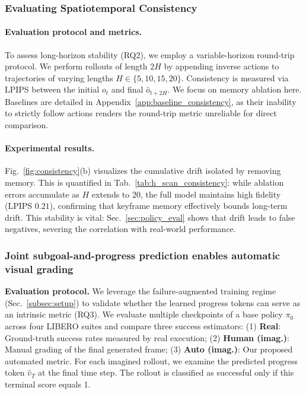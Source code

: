 \subsubsection{Evaluating Spatiotemporal Consistency}
\label{sec:exp_consistency}

\paragraph{Evaluation protocol and metrics.}
To assess long-horizon stability (RQ2), we employ a variable-horizon round-trip protocol. We perform rollouts of length $2H$ by appending inverse actions to trajectories of varying lengths $H \in \{5, 10, 15, 20\}$. Consistency is measured via LPIPS  between the initial $o_t$ and final $\hat{o}_{t+2H}$.
We focus on memory ablation here. Baselines are detailed in Appendix~\ref{app:baseline_consistency}, as their inability to strictly follow actions  renders the round-trip metric unreliable for direct comparison.


\paragraph{Experimental results.}
Fig.~\ref{fig:consistency}(b) visualizes the cumulative drift isolated by removing memory.
This is quantified in Tab.~\ref{tab:h_scan_consistency}: while ablation errors accumulate as $H$ extends to 20, the full model maintains high fidelity (LPIPS $0.21$), confirming that keyframe memory effectively bounds long-term drift. This stability is vital: Sec.~\ref{sec:policy_eval} shows that drift leads to false negatives, severing the correlation with real-world performance.

\subsubsection{Joint subgoal-and-progress prediction enables automatic visual grading}
\label{sec:joint_progress}

\textbf{Evaluation protocol.}
We leverage the failure-augmented training regime (Sec.~\ref{subsec:setup}) to validate whether the learned progress tokens can serve as an intrinsic metric (RQ3). 
We evaluate multiple checkpoints of a base policy $\pi_0$ across four LIBERO suites and compare three success estimators:
(1) \textbf{Real}: Ground-truth success rates measured by real execution;
(2) \textbf{Human (imag.)}: Manual grading of the final generated frame;
(3) \textbf{Auto (imag.)}: Our proposed automated metric. For each imagined rollout, we examine the predicted progress token $\hat{v}_{T}$ at the final time step. The rollout is classified as successful only if this terminal score equals 1.


